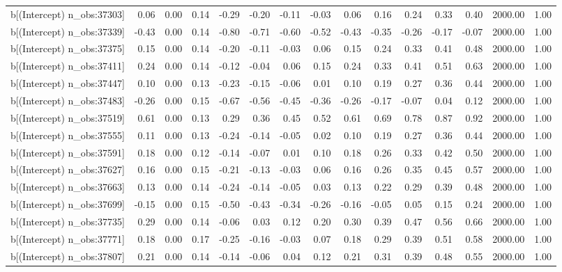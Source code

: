 \begin{table}[ht]
\begin{tabular}{rrrrrrrrrrrrrrr}
  b[(Intercept) n\_obs:37303] & 0.06 & 0.00 & 0.14 & -0.29 & -0.20 & -0.11 & -0.03 & 0.06 & 0.16 & 0.24 & 0.33 & 0.40 & 2000.00 & 1.00 \\ 
  b[(Intercept) n\_obs:37339] & -0.43 & 0.00 & 0.14 & -0.80 & -0.71 & -0.60 & -0.52 & -0.43 & -0.35 & -0.26 & -0.17 & -0.07 & 2000.00 & 1.00 \\ 
  b[(Intercept) n\_obs:37375] & 0.15 & 0.00 & 0.14 & -0.20 & -0.11 & -0.03 & 0.06 & 0.15 & 0.24 & 0.33 & 0.41 & 0.48 & 2000.00 & 1.00 \\ 
  b[(Intercept) n\_obs:37411] & 0.24 & 0.00 & 0.14 & -0.12 & -0.04 & 0.06 & 0.15 & 0.24 & 0.33 & 0.41 & 0.51 & 0.63 & 2000.00 & 1.00 \\ 
  b[(Intercept) n\_obs:37447] & 0.10 & 0.00 & 0.13 & -0.23 & -0.15 & -0.06 & 0.01 & 0.10 & 0.19 & 0.27 & 0.36 & 0.44 & 2000.00 & 1.00 \\ 
  b[(Intercept) n\_obs:37483] & -0.26 & 0.00 & 0.15 & -0.67 & -0.56 & -0.45 & -0.36 & -0.26 & -0.17 & -0.07 & 0.04 & 0.12 & 2000.00 & 1.00 \\ 
  b[(Intercept) n\_obs:37519] & 0.61 & 0.00 & 0.13 & 0.29 & 0.36 & 0.45 & 0.52 & 0.61 & 0.69 & 0.78 & 0.87 & 0.92 & 2000.00 & 1.00 \\ 
  b[(Intercept) n\_obs:37555] & 0.11 & 0.00 & 0.13 & -0.24 & -0.14 & -0.05 & 0.02 & 0.10 & 0.19 & 0.27 & 0.36 & 0.44 & 2000.00 & 1.00 \\ 
  b[(Intercept) n\_obs:37591] & 0.18 & 0.00 & 0.12 & -0.14 & -0.07 & 0.01 & 0.10 & 0.18 & 0.26 & 0.33 & 0.42 & 0.50 & 2000.00 & 1.00 \\ 
  b[(Intercept) n\_obs:37627] & 0.16 & 0.00 & 0.15 & -0.21 & -0.13 & -0.03 & 0.06 & 0.16 & 0.26 & 0.35 & 0.45 & 0.57 & 2000.00 & 1.00 \\ 
  b[(Intercept) n\_obs:37663] & 0.13 & 0.00 & 0.14 & -0.24 & -0.14 & -0.05 & 0.03 & 0.13 & 0.22 & 0.29 & 0.39 & 0.48 & 2000.00 & 1.00 \\ 
  b[(Intercept) n\_obs:37699] & -0.15 & 0.00 & 0.15 & -0.50 & -0.43 & -0.34 & -0.26 & -0.16 & -0.05 & 0.05 & 0.15 & 0.24 & 2000.00 & 1.00 \\ 
  b[(Intercept) n\_obs:37735] & 0.29 & 0.00 & 0.14 & -0.06 & 0.03 & 0.12 & 0.20 & 0.30 & 0.39 & 0.47 & 0.56 & 0.66 & 2000.00 & 1.00 \\ 
  b[(Intercept) n\_obs:37771] & 0.18 & 0.00 & 0.17 & -0.25 & -0.16 & -0.03 & 0.07 & 0.18 & 0.29 & 0.39 & 0.51 & 0.58 & 2000.00 & 1.00 \\ 
  b[(Intercept) n\_obs:37807] & 0.21 & 0.00 & 0.14 & -0.14 & -0.06 & 0.04 & 0.12 & 0.21 & 0.31 & 0.39 & 0.48 & 0.55 & 2000.00 & 1.00 \\ 

\end{tabular}
\end{table}
